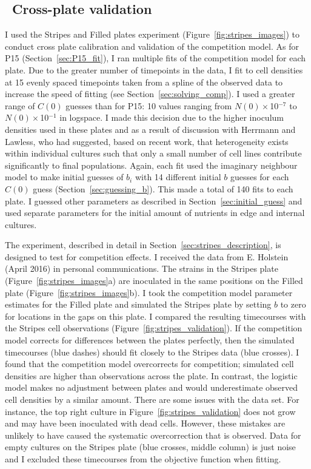 \begin{multicols}{2}

\subsection{\thesubsection~Cross-plate validation}
\label{sec:cross_plate_val_results}

I used the Stripes and Filled plates experiment
(Figure~\ref{fig:stripes_images}) to conduct cross plate calibration
and validation of the competition model. As for P15
(Section~\ref{sec:P15_fit}), I ran multiple fits of the competition
model for each plate. Due to the greater number of timepoints in the
data, I fit to cell densities at 15 evenly spaced timepoints taken
from a spline of the observed data to increase the speed of fitting
(see Section~\ref{sec:solving_comp}). I used a greater range of
\(C(0)\) guesses than for P15: 10 values ranging from
\(N(0)\times\)10\(^{-7}\) to \(N(0)\times\)10\(^{-1}\) in logspace. I
made this decision due to the higher inoculum densities used in these
plates and as a result of discussion with Herrmann and Lawless, who
had suggested, based on recent work, that heterogeneity exists within
individual cultures such that only a small number of cell lines
contribute significantly to final populations. Again, each fit used
the imaginary neighbour model to make initial guesses of \(b_{i}\)
with 14 different initial \(b\) guesses for each \(C(0)\) guess
(Section~\ref{sec:guessing_b}). This made a total of 140 fits to each
plate. I guessed other parameters as described in
Section~\ref{sec:initial_guess} and used separate parameters for the
initial amount of nutrients in edge and internal cultures.

The experiment, described in detail in
Section~\ref{sec:stripes_description}, is designed to test for
competition effects. I received the data from E. Holstein (April 2016)
in personal communications. The strains in the Stripes plate
(Figure~\ref{fig:stripes_images}a) are inoculated in the same
positions on the Filled plate (Figure~\ref{fig:stripes_images}b). I
took the competition model parameter estimates for the Filled plate
and simulated the Stripes plate by setting \(b\) to zero for locations
in the gaps on this plate. I compared the resulting timecourses with
the Stripes cell observations
(Figure~\ref{fig:stripes_validation}). If the competition model
corrects for differences between the plates perfectly, then the
simulated timecourses (blue dashes) should fit closely to the Stripes
data (blue crosses). I found that the competition model overcorrects
for competition; simulated cell densities are higher than observations
across the plate. In contrast, the logistic model makes no adjustment
between plates and would underestimate observed cell densities by a
similar amount. There are some issues with the data set. For instance,
the top right culture in Figure~\ref{fig:stripes_validation} does not
grow and may have been inoculated with dead cells. However, these
mistakes are unlikely to have caused the systematic overcorrection
that is observed. Data for empty cultures on the Stripes plate (blue
crosses, middle column) is just noise and I excluded these timecourses
from the objective function when fitting.


\end{multicols}
